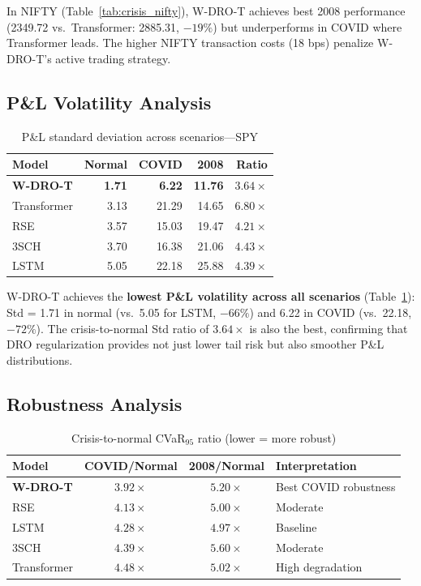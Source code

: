 \documentclass[11pt]{article}
\begin{document}
In NIFTY (Table~\ref{tab:crisis_nifty}), W-DRO-T achieves best 2008 performance (2349.72 vs.\ Transformer: 2885.31, $-19\%$) but underperforms in COVID where Transformer leads. The higher NIFTY transaction costs (18 bps) penalize W-DRO-T's active trading strategy.

\subsection{P\&L Volatility Analysis}

\begin{table}[t]
\centering
\caption{P\&L standard deviation across scenarios---SPY}
\label{tab:stdpnl}
\small
\begin{tabular}{lrrrr}
\toprule
\textbf{Model} & \textbf{Normal} & \textbf{COVID} & \textbf{2008} & \textbf{Ratio} \\
\midrule
\textbf{W-DRO-T} & \textbf{1.71} & \textbf{6.22} & \textbf{11.76} & $3.64\times$ \\
Transformer & 3.13 & 21.29 & 14.65 & $6.80\times$ \\
RSE & 3.57 & 15.03 & 19.47 & $4.21\times$ \\
3SCH & 3.70 & 16.38 & 21.06 & $4.43\times$ \\
LSTM & 5.05 & 22.18 & 25.88 & $4.39\times$ \\
\bottomrule
\end{tabular}
\end{table}

W-DRO-T achieves the \textbf{lowest P\&L volatility across all scenarios} (Table~\ref{tab:stdpnl}): Std = 1.71 in normal (vs.\ 5.05 for LSTM, $-66\%$) and 6.22 in COVID (vs.\ 22.18, $-72\%$). The crisis-to-normal Std ratio of $3.64\times$ is also the best, confirming that DRO regularization provides not just lower tail risk but also smoother P\&L distributions.

\subsection{Robustness Analysis}

\begin{table}[t]
\centering
\caption{Crisis-to-normal CVaR$_{95}$ ratio (lower = more robust)}
\label{tab:robustness}
\small
\begin{tabular}{lccl}
\toprule
\textbf{Model} & \textbf{COVID/Normal} & \textbf{2008/Normal} & \textbf{Interpretation} \\
\midrule
\textbf{W-DRO-T} & $\mathbf{3.92\times}$ & $5.20\times$ & Best COVID robustness \\
RSE & $4.13\times$ & $5.00\times$ & Moderate \\
LSTM & $4.28\times$ & $4.97\times$ & Baseline \\
3SCH & $4.39\times$ & $5.60\times$ & Moderate \\
Transformer & $4.48\times$ & $5.02\times$ & High degradation \\
\bottomrule
\end{tabular}
\end{table}
\end{document}
